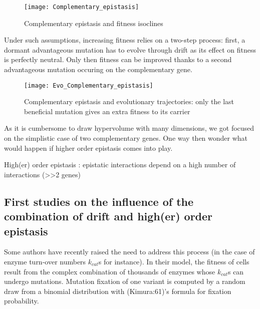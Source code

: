 \documentclass[]{article}
\begin{document}
\begin{figure}

{\centering \texttt{[image: Complementary\_epistasis]} 

}

\caption{Complementary epistasis and fitness isoclines}\label{fig:compepi}
\end{figure}

Under such assumptions, increasing fitness relies on a two-step process:
first, a dormant advantageous mutation has to evolve through drift as
its effect on fitness is perfectly neutral. Only then fitness can be
improved thanks to a second advantageous mutation occuring on the
complementary gene.

\begin{figure}

{\centering \texttt{[image: Evo\_Complementary\_epistasis]} 

}

\caption{Complementary epistasis and evolutionary trajectories: only the last beneficial mutation gives an extra fitness to its carrier}\label{fig:trajcompepi}
\end{figure}

As it is cumbersome to draw hypervolume with many dimensions, we got
focused on the simplistic case of two complementary genes. One way then
wonder what would happen if higher order epistasis comes into play.

High(er) order epistasis : epistatic interactions depend on a high
number of interactions (\textgreater{}\textgreater{}2 genes)

\hypertarget{first-studies-on-the-influence-of-the-combination-of-drift-and-higher-order-epistasis}{%
\subsection{First studies on the influence of the combination of drift
and high(er) order
epistasis}\label{first-studies-on-the-influence-of-the-combination-of-drift-and-higher-order-epistasis}}

Some authors have recently raised the need to address this process (in
the case of enzyme turn-over numbers \(k_{cat}\)s for instance). In
their model, the fitness of cells result from the complex combination of
thousands of enzymes whose \(k_{cat}\)s can undergo mutations. Mutation
fixation of one variant is computed by a random draw from a binomial
distribution with (Kimura:61)'s formula for fixation probability.
\end{document}
